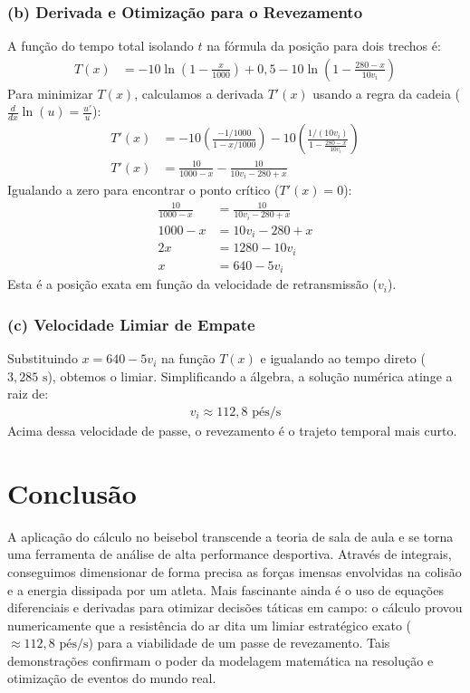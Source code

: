 \documentclass[12pt,a4paper]{article}
\begin{document}
\subsubsection*{(b) Derivada e Otimização para o Revezamento}
A função do tempo total isolando $t$ na fórmula da posição para dois trechos é:
\begin{align*}
    T(x) &= -10 \ln\left(1 - \frac{x}{1000}\right) + 0{,}5 - 10 \ln\left(1 - \frac{280-x}{10v_i}\right)
\end{align*}
Para minimizar $T(x)$, calculamos a derivada $T'(x)$ usando a regra da cadeia ($\frac{d}{dx} \ln(u) = \frac{u'}{u}$):
\begin{align*}
    T'(x) &= -10 \left( \frac{-1/1000}{1 - x/1000} \right) - 10 \left( \frac{1/(10v_i)}{1 - \frac{280-x}{10v_i}} \right) \\
    T'(x) &= \frac{10}{1000 - x} - \frac{10}{10v_i - 280 + x}
\end{align*}
Igualando a zero para encontrar o ponto crítico ($T'(x) = 0$):
\begin{align*}
    \frac{10}{1000 - x} &= \frac{10}{10v_i - 280 + x} \\
    1000 - x &= 10v_i - 280 + x \\
    2x &= 1280 - 10v_i \\
    x &= 640 - 5v_i
\end{align*}
Esta é a posição exata em função da velocidade de retransmissão ($v_i$).

\subsubsection*{(c) Velocidade Limiar de Empate}
Substituindo $x = 640 - 5v_i$ na função $T(x)$ e igualando ao tempo direto ($3{,}285\text{ s}$), obtemos o limiar. Simplificando a álgebra, a solução numérica atinge a raiz de:
\begin{align*}
    v_i \approx 112{,}8\text{ pés/s}
\end{align*}
Acima dessa velocidade de passe, o revezamento é o trajeto temporal mais curto.

\section{Conclusão}
A aplicação do cálculo no beisebol transcende a teoria de sala de aula e se torna uma ferramenta de análise de alta performance desportiva. Através de integrais, conseguimos dimensionar de forma precisa as forças imensas envolvidas na colisão e a energia dissipada por um atleta. Mais fascinante ainda é o uso de equações diferenciais e derivadas para otimizar decisões táticas em campo: o cálculo provou numericamente que a resistência do ar dita um limiar estratégico exato ($\approx 112{,}8\text{ pés/s}$) para a viabilidade de um passe de revezamento. Tais demonstrações confirmam o poder da modelagem matemática na resolução e otimização de eventos do mundo real.
\end{document}
